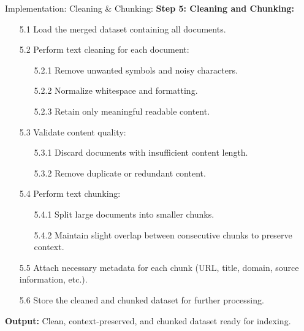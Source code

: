 \begin{frame}{Implementation: Cleaning \& Chunking: }
    \textbf{Step 5: Cleaning and Chunking:}
    \begin{itemize}
    
        \item[5.1] Load the merged dataset containing all documents.
    
        \item[5.2] Perform text cleaning for each document:
              \begin{itemize}
                  \item[5.2.1] Remove unwanted symbols and noisy characters.
                  \item[5.2.2] Normalize whitespace and formatting.
                  \item[5.2.3] Retain only meaningful readable content.
              \end{itemize}
    
        \item[5.3] Validate content quality:
              \begin{itemize}
                  \item[5.3.1] Discard documents with insufficient content length.
                  \item[5.3.2] Remove duplicate or redundant content.
              \end{itemize}
    
        \item[5.4] Perform text chunking:
              \begin{itemize}
                  \item[5.4.1] Split large documents into smaller chunks.
                  \item[5.4.2] Maintain slight overlap between consecutive chunks to preserve context.
              \end{itemize}
    
        \item[5.5] Attach necessary metadata for each chunk
                  (URL, title, domain, source information, etc.).
    
        \item[5.6] Store the cleaned and chunked dataset for further processing.
    
    \end{itemize}
    
    \textbf{Output:} Clean, context-preserved, and chunked dataset ready for indexing.

\end{frame}

